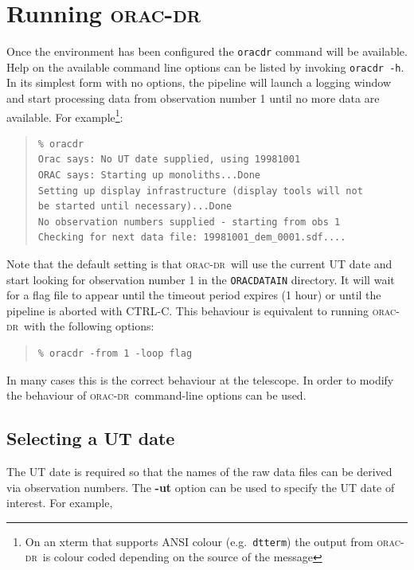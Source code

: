 \documentclass[twoside,11pt]{article}
\newcommand{\xref}[3]{#1}
\newcommand{\xlabel}[1]{}
\renewcommand{\_}{\texttt{\symbol{95}}}
\newcommand{\oracdr}{\xref{\textsc{orac-dr}}{sun230}{}}
\newenvironment{myquote}{\begin{quote}\begin{small}}{\end{small}\end{quote}}
\begin{document}
\section{Running \oracdr\xlabel{running_orac_dr}}

Once the environment has been configured the \texttt{oracdr} command
will be available. Help on the available command line options
can be listed by invoking \texttt{oracdr -h}. In its simplest
form with no options, the pipeline will launch a logging window and
start processing data from observation number 1 until no more data are
available. For example\footnote{On an xterm that supports ANSI colour (e.g.\
\texttt{dtterm}) the output from \oracdr\ is colour coded depending on the
source of the message}:

\begin{myquote}
\begin{verbatim}
% oracdr
Orac says: No UT date supplied, using 19981001
ORAC says: Starting up monoliths...Done
Setting up display infrastructure (display tools will not
be started until necessary)...Done
No observation numbers supplied - starting from obs 1
Checking for next data file: 19981001_dem_0001.sdf....
\end{verbatim}
\end{myquote}
Note that the default setting is that \oracdr\ will use the current UT
date and start looking for observation number 1 in the \texttt{ORAC\_DATA\_IN}
directory. It will wait for a flag file to appear until the timeout period expires
(1 hour) or until the pipeline is aborted with CTRL-C. This behaviour
is equivalent to running \oracdr\ with the following options:
\begin{myquote}
\begin{verbatim}
% oracdr -from 1 -loop flag
\end{verbatim}
\end{myquote}

In many cases this is the correct behaviour at the telescope. In order to
modify the behaviour of \oracdr\ command-line options can be used.

\subsection{Selecting a UT date\xlabel{selecting_a_ut_date}}

The UT date is required so that the names of the raw data files can be
derived via observation numbers. The \textbf{-ut} option can be used
to specify the UT date of interest. For example,
\end{document}
